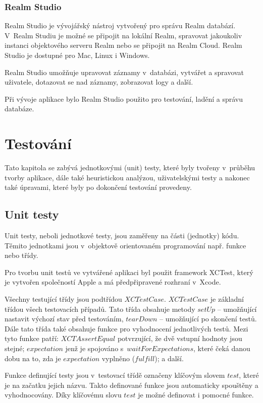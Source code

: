 \documentclass[thesis=M,czech]{FITthesis}[2012/06/26]
\begin{document}
\subsection{Realm Studio}
Realm Studio je vývojářský nástroj vytvořený pro správu Realm databází. V~Realm Studiu je možné se připojit na lokální Realm, spravovat jakoukoliv instanci objektového serveru Realm nebo se připojit na Realm Cloud. Realm Studio je dostupné pro Mac, Linux i Windows. \cite{realmStudio}

Realm Studio umožňuje upravovat záznamy v~databázi, vytvářet a spravovat uživatele, dotazovat se nad záznamy, zobrazovat logy a další. \cite{realmStudio}

Při vývoje aplikace bylo Realm Studio použito pro testování, ladění a správu databáze.

\chapter{Testování}
Tato kapitola se zabývá jednotkovými (unit) testy, které byly tvořeny v~průběhu tvorby aplikace, dále také heuristickou analýzou, uživatelskými testy a nakonec také úpravami, které byly po dokončení testování provedeny.

\section{Unit testy}
Unit testy, neboli jednotkové testy, jsou zaměřeny na části (jednotky) kódu. Těmito jednotkami jsou v~objektově orientovaném programování např. funkce nebo třídy. \cite{unitTesting}

Pro tvorbu unit testů ve vytvářené aplikaci byl použit framework XCTest, který je vytvořen společností Apple a má předpřipravené rozhraní v~Xcode. \cite{appleTesting}

Všechny testující třídy jsou podtřídou $XCTestCase$. $XCTestCase$ je základní třídou všech testovacích případů. Tato třída obsahuje metody $setUp$ -- umožňující nastavit výchozí stav před testováním, $tearDown$ -- umožňující  po skončení testů. Dále tato třída také obsahuje funkce pro vyhodnocení jednotlivých testů. Mezi tyto funkce patří: $XCTAssertEqual$ potvrzující, že dvě vstupní hodnoty jsou stejné; $expectation$ jenž je spojováno s~$waitForExpectations$, které čeká danou dobu na to, zda je $expectation$ vyplněno ($fulfill$); a další. \cite{XCTestCase}

Funkce definující testy jsou v~testovací třídě označeny klíčovým slovem $test$, které je na začatku jejich názvu. Takto definované funkce jsou automaticky spouštěny a vyhodnocovány. Díky klíčovému slovu $test$ je možné definovat i pomocné funkce. \cite{XCTestCase}
\end{document}

